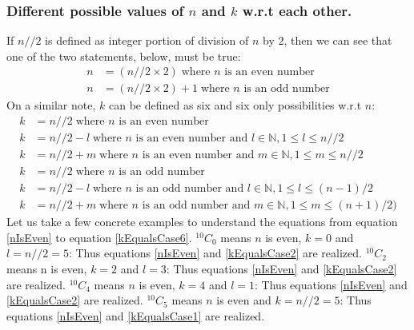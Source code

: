 \documentclass[10pt, twoside]{article}
\newcommand*{\Combination}[2]{{}^{#1}C_{#2}}%
\begin{document}
\subsubsection{Different possible values of $n$ and $k$ w.r.t each other.}
 If $n//2$ is defined as integer portion of division of $n$ by $2$, then we can see that one of the two statements, below, must be true:
 \begin{align}
 	n &= (n//2 \times 2) \; \text{where $n$ is an even number} \label{nIsEven}\\
 	n &= (n//2 \times 2) + 1 \; \text{where $n$ is an odd number} \label{nIsOdd}
 \end{align}
On a similar note, $k$ can be defined as six and six only possibilities w.r.t $n$:
\begin{align}
	k &= n//2 \; \text{where $n$ is an even number }\label{kEqualsCase1}\\
	k &= n//2 - l \; \text{where $n$ is an even number and } l \in \mathbb{N} , 1 \leq l \leq n//2 \label{kEqualsCase2}\\
	k &= n//2 + m \; \text{where $n$ is an even number and } m \in \mathbb{N} , 1 \leq m \leq n//2 \label{kEqualsCase3}\\
	k &= n//2 \; \text{where $n$ is an odd number }\label{kEqualsCase4}\\
	k &= n//2 - l \; \text{where $n$ is an odd number and } l \in \mathbb{N} , 1 \leq l \leq (n-1)/2 \label{kEqualsCase5}\\
	k &= n//2 + m \; \text{where $n$ is an odd number and } m \in \mathbb{N} , 1 \leq m \leq (n+1)/2) \label{kEqualsCase6}		
\end{align}
Let us take a few concrete examples to understand the equations from equation \eqref{nIsEven} to equation \eqref{kEqualsCase6}.\newline\newline
$\Combination{10}{0}$ means $n$ is even, $k = 0$ and $l=n//2=5$: Thus equations \eqref{nIsEven} and \eqref{kEqualsCase2} are realized.\newline
$\Combination{10}{2}$ means n is even, $k = 2$ and $l=3$: Thus equations \eqref{nIsEven} and \eqref{kEqualsCase2} are realized.\newline
$\Combination{10}{4}$ means $n$ is even, $k = 4$ and $l=1$: Thus equations \eqref{nIsEven} and \eqref{kEqualsCase2} are realized.\newline\newline
$\Combination{10}{5}$ means $n$ is even and $k = n//2 = 5$: Thus equations \eqref{nIsEven} and \eqref{kEqualsCase1} are realized.\newline\newline
\end{document}
